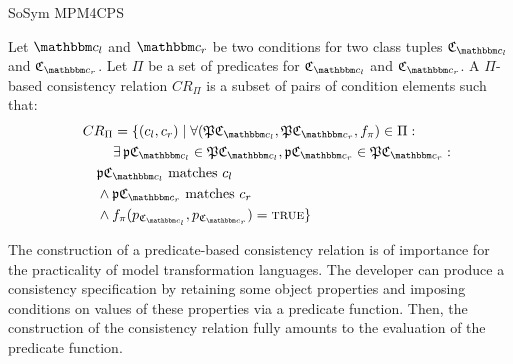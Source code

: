 \begin{copiedFrom}{SoSym MPM4CPS}
\begin{definition}
Let $\condition{c}{l}$ and $\condition{c}{r}$ be two conditions for two class tuples $\classtuple{C}{\condition{c}{l}}$ and $\classtuple{C}{\condition{c}{r}}$. 
Let $\Pi$ be a set of predicates for $\classtuple{C}{\condition{c}{l}}$ and $\classtuple{C}{\condition{c}{r}}$. A $\Pi$-based consistency relation $CR_{\Pi}$ is a subset of pairs of condition elements such that:
\begin{align*}
\formulaskip &
CR_{\Pi} = \{(c_l, c_r) \mid \forall (\tuple{P}{\classtuple{C}{\condition{c}{l}}}, \tuple{P}{\classtuple{C}{\condition{c}{r}}}, f_\pi) \in \Pi : \\
& \formulaskip\formulaskip
\exists \tuple{p}{\classtuple{C}{\condition{c}{l}}} \in \tuple{P}{\classtuple{C}{\condition{c}{l}}},
\tuple{p}{\classtuple{C}{\condition{c}{r}}} \in \tuple{P}{\classtuple{C}{\condition{c}{r}}}:\\
& \formulaskip
\propertyvaluesettuple{p}{\classtuple{C}{\condition{c}{l}}}\  \text{matches}\ c_l \\
& \formulaskip
\wedge \propertyvaluesettuple{p}{\classtuple{C}{\condition{c}{r}}}\ \text{matches}\ c_r \\
& \formulaskip 
\wedge f_{\pi}(p_{\classtuple{C}{\condition{c}{l}}}, p_{\classtuple{C}{\condition{c}{r}}}) = \textsc{true}\}
\end{align*}
\end{definition}


The construction of a predicate-based consistency relation is of importance for the practicality of model transformation languages. The developer can produce a consistency specification by retaining some object properties and imposing conditions on values of these properties via a predicate function. Then, the construction of the consistency relation fully amounts to the evaluation of the predicate function.


\end{copiedFrom}
